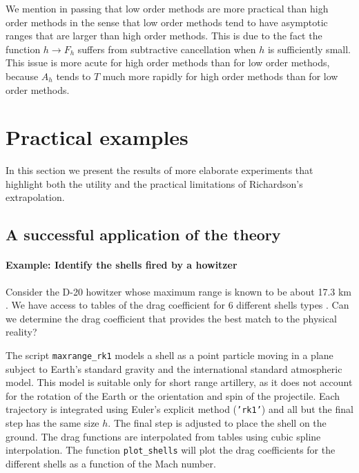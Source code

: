 \documentclass[runningheads]{llncs}
\begin{document}
We mention in passing that low order methods are more practical than high order methods in the sense that low order methods tend to have asymptotic ranges that are larger than high order methods.
This is due to the fact the function $h \rightarrow F_h$ suffers from subtractive cancellation when $h$ is sufficiently small. This issue is more acute for high order methods than for low order methods, because $A_h$ tends to $T$ much more rapidly for high order methods than for low order methods.


\section{Practical examples}

In this section we present the results of more elaborate experiments that highlight both the utility and the practical limitations of Richardson's extrapolation.

\subsection{A successful application of the theory}


\paragraph{Example: Identify the shells fired by a howitzer}

Consider the D-20 howitzer whose maximum range is known to be about 17.3 km \cite{foss1976artillery}. We have access to tables of the drag coefficient for 6 different shells types \cite{jbmballistics}. Can we determine the drag coefficient that provides the best match to the physical reality?

The script {\tt maxrange\_rk1} models a shell as a point particle moving in a plane subject to Earth's standard gravity and the international standard atmospheric model. This model is suitable only for short range artillery, as it does not account for the rotation of the Earth or the orientation and spin of the projectile. Each trajectory is integrated using Euler's explicit method ({\tt 'rk1'}) and all but the final step has the same size $h$. The final step is adjusted to place the shell on the ground. The drag functions are interpolated from tables using cubic spline interpolation. The function {\tt plot\_shells} will plot the drag coefficients for the different shells as a function of the Mach number.
\end{document}
